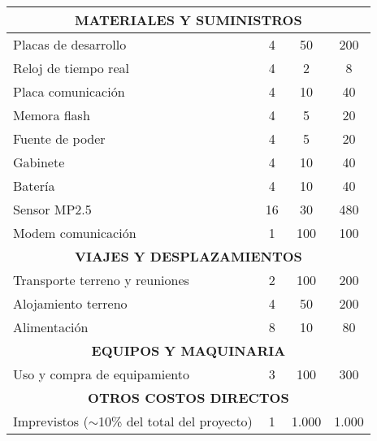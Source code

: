 \begin{table}[htpb]
\begin{tabularx}{\linewidth}{@{}|X|c|r|r|@{}}
\multicolumn{4}{|c|}{\textbf{MATERIALES Y SUMINISTROS}}\\ \hline
Placas de desarrollo 	& \multicolumn{1}{c|}{	4	} & \multicolumn{1}{c|}{	50	} &  \multicolumn{1}{c|}{	200	} \\ \hline
Reloj de tiempo real 	& \multicolumn{1}{c|}{	4	} & \multicolumn{1}{c|}{	2	} &  \multicolumn{1}{c|}{	8	} \\ \hline
Placa comunicación		& \multicolumn{1}{c|}{	4	} & \multicolumn{1}{c|}{	10	} &  \multicolumn{1}{c|}{	40	} \\ \hline
Memora flash			& \multicolumn{1}{c|}{	4	} & \multicolumn{1}{c|}{	5	} &  \multicolumn{1}{c|}{	20	} \\ \hline
Fuente de poder			& \multicolumn{1}{c|}{	4	} & \multicolumn{1}{c|}{	5	} &  \multicolumn{1}{c|}{	20	} \\ \hline
Gabinete				& \multicolumn{1}{c|}{	4	} & \multicolumn{1}{c|}{	10	} &  \multicolumn{1}{c|}{	40	} \\ \hline
Batería					& \multicolumn{1}{c|}{	4	} & \multicolumn{1}{c|}{	10	} &  \multicolumn{1}{c|}{	40	} \\ \hline
Sensor MP2.5			& \multicolumn{1}{c|}{	16	} & \multicolumn{1}{c|}{	30	} &  \multicolumn{1}{c|}{	480	} \\ \hline
Modem comunicación		& \multicolumn{1}{c|}{	1	} & \multicolumn{1}{c|}{	100	} &  \multicolumn{1}{c|}{	100	} \\ \hline


\multicolumn{4}{|c|}{\textbf{VIAJES Y DESPLAZAMIENTOS}}\\ \hline
Transporte terreno y reuniones	& \multicolumn{1}{c|}{	2	} & \multicolumn{1}{c|}{	100	} &  \multicolumn{1}{c|}{	200	} \\ \hline
Alojamiento terreno 			& \multicolumn{1}{c|}{	4	} & \multicolumn{1}{c|}{	50	} &  \multicolumn{1}{c|}{	200	} \\ \hline
Alimentación					& \multicolumn{1}{c|}{	8	} & \multicolumn{1}{c|}{	10	} &  \multicolumn{1}{c|}{	80	} \\ \hline

\multicolumn{4}{|c|}{\textbf{EQUIPOS Y MAQUINARIA}}\\ \hline
Uso y compra de equipamiento& \multicolumn{1}{c|}{	3	} & \multicolumn{1}{c|}{	100	} &  \multicolumn{1}{c|}{	300	} \\ \hline

\multicolumn{4}{|c|}{\textbf{OTROS COSTOS DIRECTOS}}\\ \hline
Imprevistos	($\sim$10\% del total del  proyecto)				& \multicolumn{1}{c|}{	1	} & \multicolumn{1}{c|}{	1.000	} &  \multicolumn{1}{c|}{	1.000	} \\ \hline


\end{tabularx}
\end{table}
